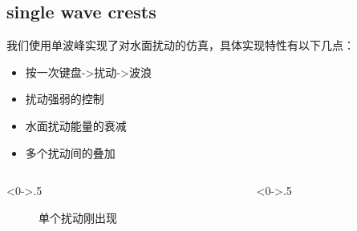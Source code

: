 \documentclass[handout,t]{beamer}
\begin{document}
\subsection{single wave crests}

\begin{frame}

我们使用单波峰实现了对水面扰动的仿真，具体实现特性有以下几点：

\begin{itemize}
  \item 按一次键盘->扰动->波浪
  \item 扰动强弱的控制
  \item 水面扰动能量的衰减
  \item 多个扰动间的叠加
\end{itemize}


\begin{columns} %
  \begin{column}<0->{.5\textwidth}
    \begin{figure}[thpb]
      \centering
      \caption{单个扰动刚出现}
      \label{fig:wyf-single-left}
    \end{figure}
  \end{column}%
  \hfill%
  \begin{column}<0->{.5\textwidth}      
    \begin{figure}[thpb]
      \centering
      \resizebox{0.7\linewidth}{!}{
}
\end{figure}
\end{column}
\end{columns}
\end{frame}
\end{document}
